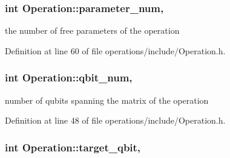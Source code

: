 \subsubsection[{\texorpdfstring{parameter\+\_\+num}{parameter_num}}]{\setlength{\rightskip}{0pt plus 5cm}int Operation\+::parameter\+\_\+num\hspace{0.3cm}{\ttfamily [protected]}, {\ttfamily [inherited]}}\hypertarget{class_operation_aa57505afe5b5ec27f6d053044b86e043}{}\label{class_operation_aa57505afe5b5ec27f6d053044b86e043}


the number of free parameters of the operation 



Definition at line 60 of file operations/include/\+Operation.\+h.

\subsubsection[{\texorpdfstring{qbit\+\_\+num}{qbit_num}}]{\setlength{\rightskip}{0pt plus 5cm}int Operation\+::qbit\+\_\+num\hspace{0.3cm}{\ttfamily [protected]}, {\ttfamily [inherited]}}\hypertarget{class_operation_aecd5fbf1dd4ea532b2e58471ff8bad69}{}\label{class_operation_aecd5fbf1dd4ea532b2e58471ff8bad69}


number of qubits spanning the matrix of the operation 



Definition at line 48 of file operations/include/\+Operation.\+h.

\subsubsection[{\texorpdfstring{target\+\_\+qbit}{target_qbit}}]{\setlength{\rightskip}{0pt plus 5cm}int Operation\+::target\+\_\+qbit\hspace{0.3cm}{\ttfamily [protected]}, {\ttfamily [inherited]}}\hypertarget{class_operation_a3e489b72c124b494777c71b1646bb1e9}{}\label{class_operation_a3e489b72c124b494777c71b1646bb1e9}


